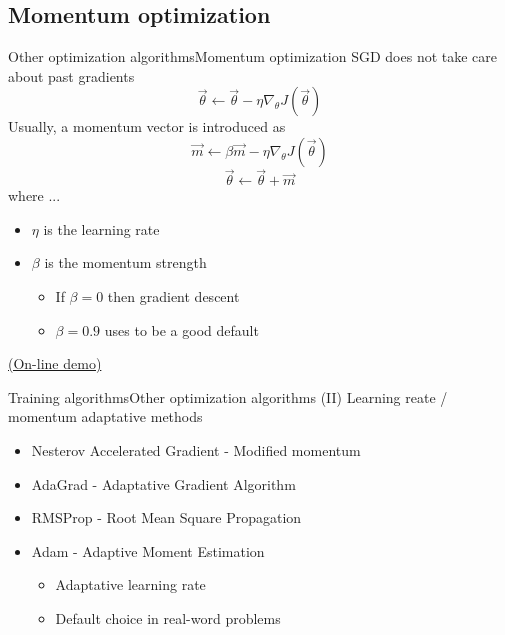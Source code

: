 \documentclass[10pt,compress]{beamer} %
\begin{document}
\subsection{Momentum optimization}

\begin{frame}{Other optimization algorithms}{Momentum optimization}
    SGD does not take care about past gradients
	\begin{equation*}
		\vec{\theta} \leftarrow \vec{\theta} - \eta \nabla_{\theta} J(\vec{\theta})
	\end{equation*}
    Usually, a \alert{momentum} vector is introduced as
	\begin{equation*}
		\vec{m} \leftarrow \beta \vec{m} - \eta \nabla_\theta J(\vec{\theta})
        \end{equation*}
	\begin{equation*}
		\vec{\theta} \leftarrow \vec{\theta} + \vec{m}
        \end{equation*}
    where ...
    \begin{itemize}
	\item $\eta$ is the learning rate
	\item $\beta$ is the momentum strength
		\begin{itemize}
        		\item If $\beta = 0$ then gradient descent
			\item $\beta=0.9$ uses to be a good default
		\end{itemize}
    \end{itemize}

    \href{http://distill.pub/2017/momentum/}{(On-line demo)}
\end{frame}

\begin{frame}{Training algorithms}{Other optimization algorithms (II)}
	Learning reate / momentum  adaptative methods
	\begin{itemize}
		\item Nesterov Accelerated Gradient - Modified momentum
		\item AdaGrad - Adaptative Gradient Algorithm
		\item RMSProp - Root Mean Square Propagation
		\item Adam - Adaptive Moment Estimation
			\begin{itemize}
				\item Adaptative learning rate
				\item Default choice in real-word problems
			\end{itemize}
	\end{itemize}
\end{frame}
\end{document}
